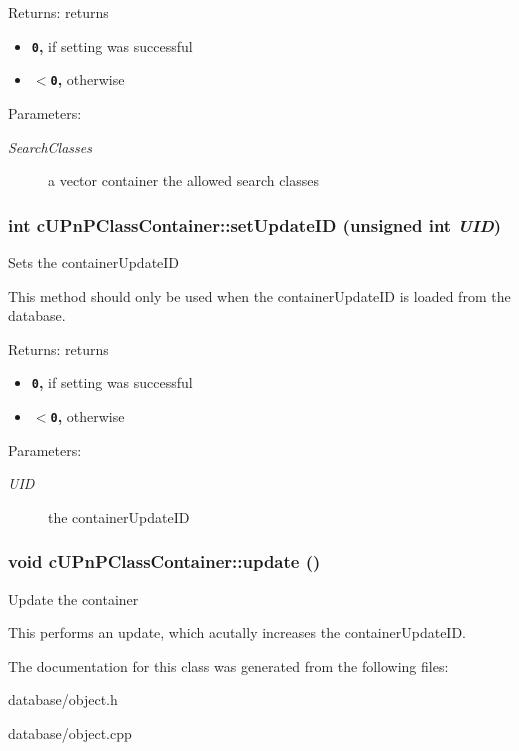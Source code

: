 \begin{Desc}
\item[Returns:]returns\begin{itemize}
\item {\bf {\tt 0},} if setting was successful\item {\bf {\tt $<$0},} otherwise \end{itemize}
\end{Desc}
\begin{Desc}
\item[Parameters:]
\begin{description}
\item[{\em SearchClasses}]a vector container the allowed search classes \end{description}
\end{Desc}
\hypertarget{classcUPnPClassContainer_9d3b9dd6388dd2021889a56a4fccfed3}{
\subsubsection[{setUpdateID}]{\setlength{\rightskip}{0pt plus 5cm}int cUPnPClassContainer::setUpdateID (unsigned int {\em UID})}}
\label{classcUPnPClassContainer_9d3b9dd6388dd2021889a56a4fccfed3}


Sets the containerUpdateID

This method should only be used when the containerUpdateID is loaded from the database.

\begin{Desc}
\item[Returns:]returns\begin{itemize}
\item {\bf {\tt 0},} if setting was successful\item {\bf {\tt $<$0},} otherwise \end{itemize}
\end{Desc}
\begin{Desc}
\item[Parameters:]
\begin{description}
\item[{\em UID}]the containerUpdateID \end{description}
\end{Desc}
\hypertarget{classcUPnPClassContainer_6f89b0043d19349efbc52caf7b7dbb3a}{
\subsubsection[{update}]{\setlength{\rightskip}{0pt plus 5cm}void cUPnPClassContainer::update ()}}
\label{classcUPnPClassContainer_6f89b0043d19349efbc52caf7b7dbb3a}


Update the container

This performs an update, which acutally increases the containerUpdateID. 

The documentation for this class was generated from the following files:\begin{CompactItemize}
\item 
database/object.h\item 
database/object.cpp\end{CompactItemize}
